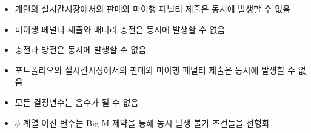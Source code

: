 \documentclass[xcolor=dvipsnames,t,9pt]{beamer}
\begin{document}
{\begin{frame}[noframenumbering]
    \small
    \begin{itemize}
        \item[(1h)] 개인의 실시간시장에서의 판매와 미이행 페널티 제출은 동시에 발생할 수 없음
        \item[(1i)] 미이행 페널티 제출와 배터리 충전은 동시에 발생할 수 없음
        \item[(1j)] 충전과 방전은 동시에 발생할 수 없음
        \item[(1k)] 포트폴리오의 실시간시장에서의 판매와 미이행 페널티 제출은 동시에 발생할 수 없음
        \item[(1l)] 모든 결정변수는 음수가 될 수 없음
        \item[(1m)] $\phi$ 계열 이진 변수는 Big-M 제약을 통해 동시 발생 불가 조건들을 선형화
    \end{itemize}
\end{frame}
}

\end{document}
